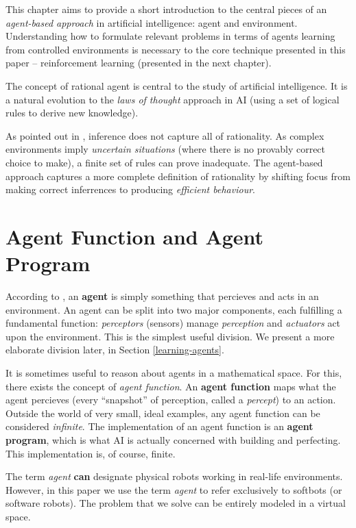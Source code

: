This chapter aims to provide a short introduction to the central pieces of an \emph{agent-based approach} in artificial intelligence: agent and environment.
Understanding how to formulate relevant problems in terms of agents learning from controlled environments is necessary to the core technique presented in this paper -- reinforcement learning (presented in the next chapter).

The concept of rational agent is central to the study of artificial intelligence. 
It is a natural evolution to the \textit{laws of thought} approach in AI (using a set of logical rules to derive new knowledge).

As pointed out in \cite{aima}, inference does not capture all of rationality.
As complex environments imply \textit{uncertain situations} (where there is no provably correct choice to make), a finite set of rules can prove inadequate.
The agent-based approach captures a more complete definition of rationality by shifting focus from making correct inferrences to producing \emph{efficient behaviour}.

\section{Agent Function and Agent Program}
According to \cite{aima}, an \textbf{agent} is simply something that percieves and acts in an environment.
An agent can be split into two major components, each fulfilling a fundamental function:
\emph{perceptors} (sensors) manage \emph{perception} and \emph{actuators} act upon the environment.
This is the simplest useful division. We present a more elaborate division later, in Section \ref{learning-agents}.

It is sometimes useful to reason about agents in a mathematical space.
For this, there exists the concept of \emph{agent function}.
An \textbf{agent function} maps what the agent percieves (every ``snapshot'' of perception, called a \emph{percept}) to an action.
Outside the world of very small, ideal examples, any agent function can be considered \emph{infinite}.
The implementation of an agent function is an \textbf{agent program}, which is what AI is actually concerned with building and perfecting.
This implementation is, of course, finite.

The term \emph{agent} \textbf{can} designate physical robots working in real-life environments.
However, in this paper we use the term \textit{agent} to refer exclusively to softbots (or software robots).
The problem that we solve can be entirely modeled in a virtual space.


